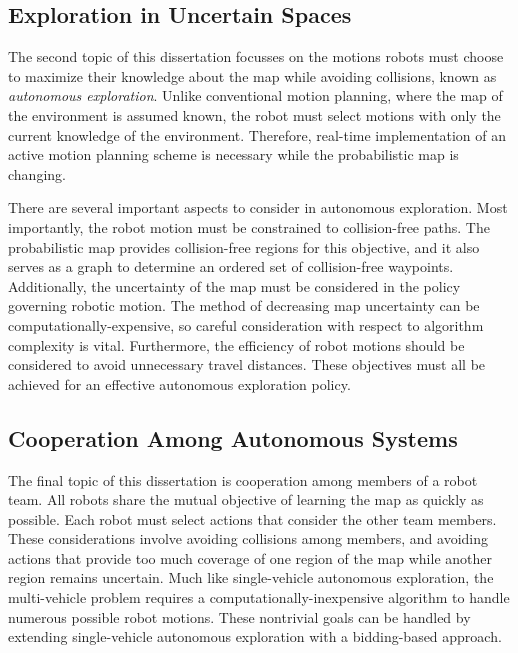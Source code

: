 \subsection{Exploration in Uncertain Spaces}

The second topic of this dissertation focusses on the motions robots must choose to maximize their knowledge about the map while avoiding collisions, known as \emph{autonomous exploration}. Unlike conventional motion planning, where the map of the environment is assumed known, the robot must select motions with only the current knowledge of the environment. Therefore, real-time implementation of an active motion planning scheme is necessary while the probabilistic map is changing.

There are several important aspects to consider in autonomous exploration. Most importantly, the robot motion must be constrained to collision-free paths. The probabilistic map provides collision-free regions for this objective, and it also serves as a graph to determine an ordered set of collision-free waypoints. Additionally, the uncertainty of the map must be considered in the policy governing robotic motion. The method of decreasing map uncertainty can be computationally-expensive, so careful consideration with respect to algorithm complexity is vital. Furthermore, the efficiency of robot motions should be considered to avoid unnecessary travel distances. These objectives must all be achieved for an effective autonomous exploration policy.


\subsection{Cooperation Among Autonomous Systems}

The final topic of this dissertation is cooperation among members of a robot team. All robots share the mutual objective of learning the map as quickly as possible. Each robot must select actions that consider the other team members. These considerations involve avoiding collisions among members, and avoiding actions that provide too much coverage of one region of the map while another region remains uncertain. Much like single-vehicle autonomous exploration, the multi-vehicle problem requires a computationally-inexpensive algorithm to handle numerous possible robot motions. These nontrivial goals can be handled by extending single-vehicle autonomous exploration with a bidding-based approach.

